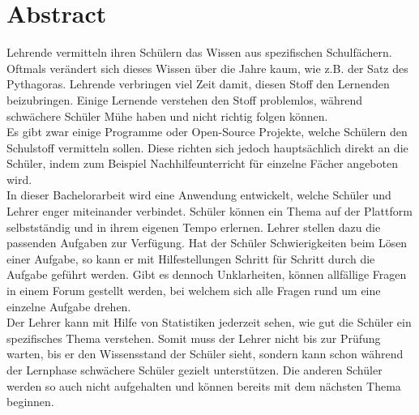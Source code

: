 \afterpage{\blankpage}
\section*{Abstract}

Lehrende vermitteln ihren Schülern das Wissen aus spezifischen Schulfächern. Oftmals verändert sich dieses Wissen über die Jahre kaum, wie z.B. der Satz des Pythagoras. Lehrende verbringen viel Zeit damit, diesen Stoff den Lernenden beizubringen. Einige Lernende verstehen den Stoff problemlos, während schwächere Schüler Mühe haben und nicht richtig folgen können. \\

Es gibt zwar einige Programme oder Open-Source Projekte, welche Schülern den Schulstoff vermitteln sollen. Diese richten sich jedoch hauptsächlich direkt an die Schüler, indem zum Beispiel Nachhilfeunterricht für einzelne Fächer angeboten wird.\\

In dieser Bachelorarbeit wird eine Anwendung entwickelt, welche Schüler und Lehrer enger miteinander verbindet. Schüler können ein Thema auf der Plattform selbstständig und in ihrem eigenen Tempo erlernen. Lehrer stellen dazu die passenden Aufgaben zur Verfügung. Hat der Schüler Schwierigkeiten beim Lösen einer Aufgabe, so kann er mit Hilfestellungen Schritt für Schritt durch die Aufgabe geführt werden. Gibt es dennoch Unklarheiten, können allfällige Fragen in einem Forum gestellt werden, bei welchem sich alle Fragen rund um eine einzelne Aufgabe drehen. \\

Der Lehrer kann mit Hilfe von Statistiken jederzeit sehen, wie gut die Schüler ein spezifisches Thema verstehen. Somit muss der Lehrer nicht bis zur Prüfung warten, bis er den Wissensstand der Schüler sieht, sondern kann schon während der Lernphase schwächere Schüler gezielt unterstützen. Die anderen Schüler werden so auch nicht aufgehalten und können bereits mit dem nächsten Thema beginnen.




\newpage